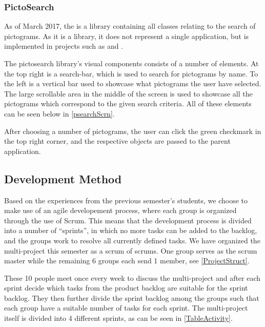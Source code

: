 
\subsubsection{PictoSearch}\label{PictoSearchReview}
As of March 2017, the  is a library containing all
classes relating to the search of pictograms. As it is a library, it does not
represent a single application, but is implemented in projects such as
 and .\nl

The pictosearch library's visual components consists of a number of
elements. At the top right is a search-bar, which is used to search for
pictograms by name. To the left is a vertical bar used to showcase what
pictograms the user have selected. The large scrollable area in the middle of
the screen is used to showcase all the pictograms which correspond to the given
search criteria. All of these elements can be seen below in
\autoref{psearchScrn}.
 

After choosing a number of pictograms, the user can click the green checkmark in
the top right corner, and the respective  objects are passed to
the parent application.

\subsection{Development Method}

Based on the experiences from the previous semester's students, we choose to
make use of an agile developement process, where each group is organized through
the use of Scrum. This means that the development process is divided into a
number of ``sprints'', in which no more tasks can be added to the backlog, and
the groups work to resolve all currently defined tasks. We have organized the
multi-project this semester as a scrum of scrums. One group serves as the scrum
master while the remaining 6 groups each send 1 member, see
\autoref{ProjectStruct}.


These 10 people meet once every week to discuss the multi-project and after each
sprint decide which tasks from the product backlog are suitable for the sprint
backlog. They then further divide the sprint backlog among the groups such that
each group have a suitable number of tasks for each sprint. The multi-project
itself is divided into 4 different sprints, as can be seen in
\autoref{TableActivity}. 


